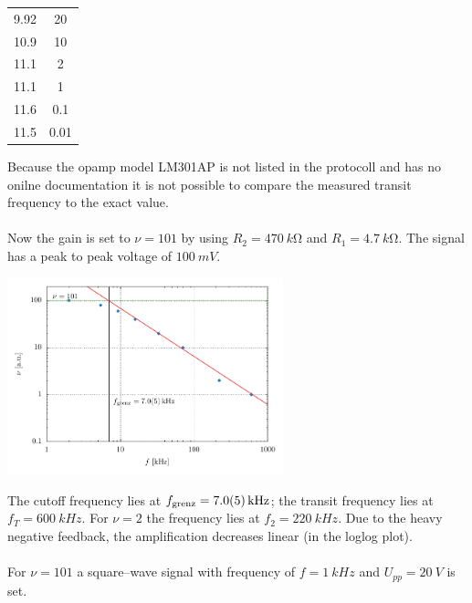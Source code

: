 \documentclass[a4paper,10pt]{article}
\newenvironment{Figure}
        {\par\medskip\noindent\minipage{\linewidth}}
        {\endminipage\par\medskip}
\numberwithin{equation}{section}
\begin{document}
\begin{multicols}{2}
\begin{center}
\begin{tabular}{|c|c|}
                        9.92 & 20\\
                        10.9 & 10\\
                        11.1 & 2\\
                        11.1 & 1\\
                        11.6 & 0.1\\
                        11.5 & 0.01\\
                        \hline
                \end{tabular}
        \end{center}
        \noindent
        Because the opamp model LM301AP is not listed in the protocoll and has no onilne documentation it is not possible to compare the measured transit frequency to the exact value.
        \\\\\noindent Now the gain is set to $\nu =101$ by using $R_2=\SI{470}{k\ohm}$ and $R_1=\SI{4.7}{k\ohm}$.
        The signal has a peak to peak voltage of $\SI{100}{mV}$.
        \begin{Figure}
                \centering
                \includegraphics[width=0.6\textwidth]{../plot/5_1_2_2_crop.pdf}
        \end{Figure}
        The cutoff frequency lies at $f_\text{grenz}=\SI{7+-0.5}{kHz}$; the transit frequency lies at $f_T=\SI{600}{kHz}$.
        For $\nu =2$ the frequency lies at $f_2=\SI{220}{kHz}$.
        Due to the heavy negative feedback, the amplification decreases linear (in the loglog plot).
        \\\\ For $\nu =101$ a square--wave signal with frequency of $f=\SI{1}{kHz}$ and $U_{p p}=\SI{20}{V}$ is set.
        \begin{Figure}
                \centering

\end{Figure}
\end{multicols}
\end{document}
